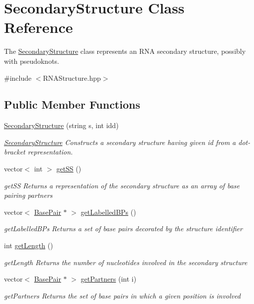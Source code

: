 \hypertarget{class_secondary_structure}{}\section{Secondary\+Structure Class Reference}
\label{class_secondary_structure}


The \hyperlink{class_secondary_structure}{Secondary\+Structure} class represents an R\+NA secondary structure, possibly with pseudoknots.  




{\ttfamily \#include $<$R\+N\+A\+Structure.\+hpp$>$}

\subsection*{Public Member Functions}
\begin{DoxyCompactItemize}
\item 
\hyperlink{class_secondary_structure_a97f5e5be69747e369416ccfb385e9144}{Secondary\+Structure} (string s, int idd)
\begin{DoxyCompactList}\small\item\em \hyperlink{class_secondary_structure}{Secondary\+Structure} Constructs a secondary structure having given id from a dot-\/bracket representation. \end{DoxyCompactList}\item 
vector$<$ int $>$ \hyperlink{class_secondary_structure_ab085ea78fe168b4f37a3abcfcea1526c}{get\+SS} ()
\begin{DoxyCompactList}\small\item\em get\+SS Returns a representation of the secondary structure as an array of base pairing partners \end{DoxyCompactList}\item 
vector$<$ \hyperlink{class_base_pair}{Base\+Pair} $\ast$ $>$ \hyperlink{class_secondary_structure_afc405eddcee83419865b31c76b98b80a}{get\+Labelled\+B\+Ps} ()
\begin{DoxyCompactList}\small\item\em get\+Labelled\+B\+Ps Returns a set of base pairs decorated by the structure identifier \end{DoxyCompactList}\item 
int \hyperlink{class_secondary_structure_a9c9c8a6a95cb900ebc1eb37113cd9215}{get\+Length} ()
\begin{DoxyCompactList}\small\item\em get\+Length Returns the number of nucleotides involved in the secondary structure \end{DoxyCompactList}\item 
vector$<$ \hyperlink{class_base_pair}{Base\+Pair} $\ast$ $>$ \hyperlink{class_secondary_structure_a6ef03f46376f3a79bd5345f357e96db6}{get\+Partners} (int i)
\begin{DoxyCompactList}\small\item\em get\+Partners Returns the set of base pairs in which a given position is involved \end{DoxyCompactList}\end{DoxyCompactItemize}


